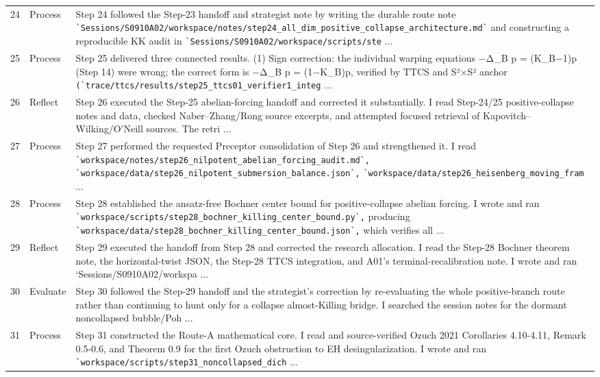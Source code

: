 \documentclass[UTF8,fontset=fandol,zihao=-4]{ctexart}
\begin{document}
\begin{longtable}{r p{} >{\raggedright\arraybackslash}p{}}
24 & Process & Step 24 followed the Step-23 handoff and strategist note by writing the durable route note \nolinkurl{`Sessions/S0910A02/workspace/notes/step24_all_dim_positive_collapse_architecture.md`} and constructing a reproducible KK audit in \nolinkurl{`Sessions/S0910A02/workspace/scripts/ste} ...\\
25 & Process & Step 25 delivered three connected results. (1) Sign correction: the individual warping equations −Δ\_B p = (K\_B−1)p (Step 14) were wrong; the correct form is −Δ\_B p = (1−K\_B)p, verified by TTCS and S²×S² anchor \nolinkurl{(`trace/ttcs/results/step25_ttcs01_verifier1_integ} ...\\
26 & Reflect & Step 26 executed the Step-25 abelian-forcing handoff and corrected it substantially. I read Step-24/25 positive-collapse notes and data, checked Naber--Zhang/Rong source excerpts, and attempted focused retrieval of Kapovitch--Wilking/O'Neill sources. The retri ...\\
27 & Process & Step 27 performed the requested Preceptor consolidation of Step 26 and strengthened it. I read \nolinkurl{`workspace/notes/step26_nilpotent_abelian_forcing_audit.md`,} \nolinkurl{`workspace/data/step26_nilpotent_submersion_balance.json`,} \nolinkurl{`workspace/data/step26_heisenberg_moving_fram} ...\\
28 & Process & Step 28 established the ansatz-free Bochner center bound for positive-collapse abelian forcing. I wrote and ran \nolinkurl{`workspace/scripts/step28_bochner_killing_center_bound.py`,} producing \nolinkurl{`workspace/data/step28_bochner_killing_center_bound.json`,} which verifies all  ...\\
29 & Reflect & Step 29 executed the handoff from Step 28 and corrected the research allocation. I read the Step-28 Bochner theorem note, the horizontal-twist JSON, the Step-28 TTCS integration, and A01's terminal-recalibration note. I wrote and ran `Sessions/S0910A02/workspa ...\\
30 & Evaluate & Step 30 followed the Step-29 handoff and the strategist's correction by re-evaluating the whole positive-branch route rather than continuing to hunt only for a collapse almost-Killing bridge. I searched the session notes for the dormant noncollapsed bubble/Poh ...\\
31 & Process & Step 31 constructed the Route-A mathematical core. I read and source-verified Ozuch 2021 Corollaries 4.10-4.11, Remark 0.5-0.6, and Theorem 0.9 for the first Ozuch obstruction to EH desingularization. I wrote and ran \nolinkurl{`workspace/scripts/step31_noncollapsed_dich} ...\\

\end{longtable}
\end{document}
